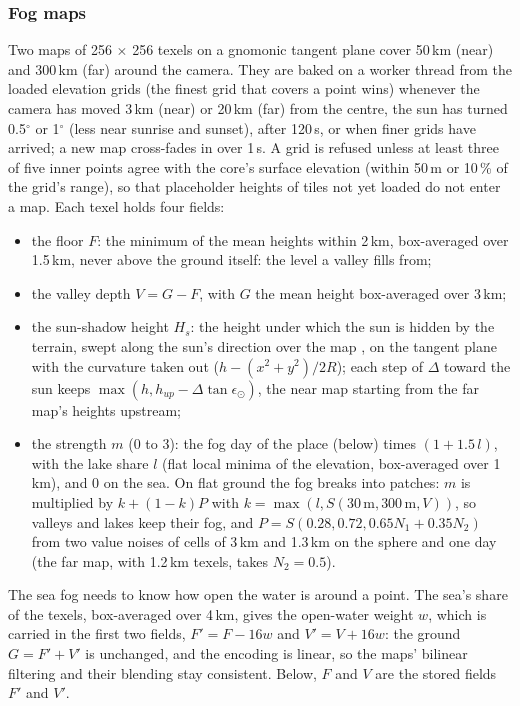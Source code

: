 \documentclass[Orbiter Technical Reference.tex]{subfiles}
\begin{document}
\begin{sloppypar}
\subsubsection{Fog maps}
Two maps of 256 $\times$ 256 texels on a gnomonic tangent plane cover 50\,km (near) and 300\,km (far) around the camera. They are baked on a worker thread from the loaded elevation grids (the finest grid that covers a point wins) whenever the camera has moved 3\,km (near) or 20\,km (far) from the centre, the sun has turned 0.5$^{\circ}$ or 1$^{\circ}$ (less near sunrise and sunset), after 120\,s, or when finer grids have arrived; a new map cross-fades in over 1\,s. A grid is refused unless at least three of five inner points agree with the core's surface elevation (within 50\,m or 10\,\% of the grid's range), so that placeholder heights of tiles not yet loaded do not enter a map. Each texel holds four fields:

\begin{itemize}
\item the floor $F$: the minimum of the mean heights within 2\,km, box-averaged over 1.5\,km, never above the ground itself: the level a valley fills from;
\item the valley depth $V = G - F$, with $G$ the mean height box-averaged over 3\,km;
\item the sun-shadow height $H_{s}$: the height under which the sun is hidden by the terrain, swept along the sun's direction over the map \cite{timonen2010}, on the tangent plane with the curvature taken out ($h - (x^{2} + y^{2})/2R$); each step of $\Delta$ toward the sun keeps $\max(h, h_{up} - \Delta\tan\epsilon_{\odot})$, the near map starting from the far map's heights upstream;
\item the strength $m$ (0 to 3): the fog day of the place (below) times $(1 + 1.5\,l)$, with the lake share $l$ (flat local minima of the elevation, box-averaged over 1\,km), and 0 on the sea. On flat ground the fog breaks into patches: $m$ is multiplied by $k + (1 - k)P$ with $k = \max(l, S(30\,\mathrm{m}, 300\,\mathrm{m}, V))$, so valleys and lakes keep their fog, and $P = S(0.28, 0.72, 0.65N_{1} + 0.35N_{2})$ from two value noises of cells of 3\,km and 1.3\,km on the sphere and one day (the far map, with 1.2\,km texels, takes $N_{2} = 0.5$).
\end{itemize}

\noindent
The sea fog needs to know how open the water is around a point. The sea's share of the texels, box-averaged over 4\,km, gives the open-water weight $w$, which is carried in the first two fields, $F' = F - 16w$ and $V' = V + 16w$: the ground $G = F' + V'$ is unchanged, and the encoding is linear, so the maps' bilinear filtering and their blending stay consistent. Below, $F$ and $V$ are the stored fields $F'$ and $V'$.


\end{sloppypar}
\end{document}
